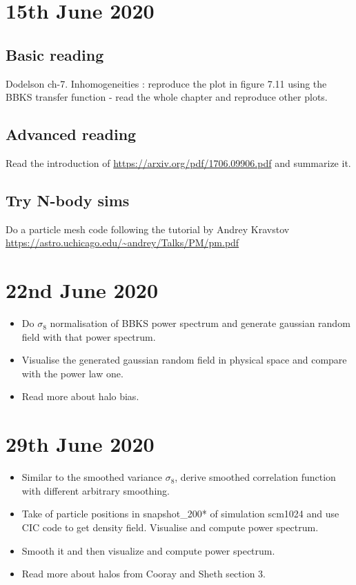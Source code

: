 \documentclass[12pt]{article}
\begin{document}
	



\section{15th June 2020}

\subsection{Basic reading}
Dodelson ch-7. Inhomogeneities : reproduce the plot in figure 7.11 using the BBKS transfer function - read the whole chapter and reproduce other plots.

\subsection{Advanced reading}
Read the introduction of \url{https://arxiv.org/pdf/1706.09906.pdf} and summarize it.

\subsection{Try N-body sims}
Do a particle mesh code following the tutorial by Andrey Kravstov \url{https://astro.uchicago.edu/~andrey/Talks/PM/pm.pdf} 


\section{22nd June 2020}

\begin{itemize}
\item Do $\sigma_8$ normalisation of BBKS power spectrum and generate gaussian random field with that power spectrum.
\item  Visualise the generated gaussian random field in physical space and compare with the power law one.
\item Read more about halo bias.
\end{itemize}
 
 
\section{29th June 2020}
\begin{itemize}
\item Similar to the smoothed variance $\sigma_8$, derive smoothed correlation function with different arbitrary smoothing.
\item Take of particle positions in {snapshot\_200*} of simulation scm1024 and use CIC code to get density field. Visualise and compute power spectrum.
\item Smooth it and then visualize and compute power spectrum.
\item Read more about halos from Cooray and Sheth section 3.
\end{itemize}
 
\end{document}
